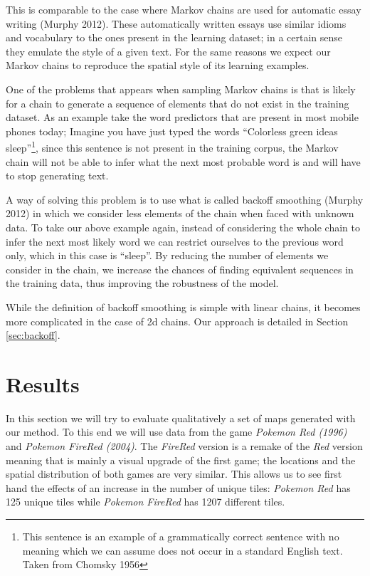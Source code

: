 \documentclass[A4paper,]{article}
\begin{document}
This is comparable to the case where Markov chains are used for
automatic essay writing (Murphy 2012). These automatically written
essays use similar idioms and vocabulary to the ones present in the
learning dataset; in a certain sense they emulate the style of a given
text. For the same reasons we expect our Markov chains to reproduce the
spatial style of its learning examples.

One of the problems that appears when sampling Markov chains is that is
likely for a chain to generate a sequence of elements that do not exist
in the training dataset. As an example take the word predictors that are
present in most mobile phones today; Imagine you have just typed the
words ``Colorless green ideas sleep''\footnote{This sentence is an
  example of a grammatically correct sentence with no meaning which we
  can assume does not occur in a standard English text. Taken from
  Chomsky 1956}, since this sentence is not present in the training
corpus, the Markov chain will not be able to infer what the next most
probable word is and will have to stop generating text.

A way of solving this problem is to use what is called backoff smoothing
(Murphy 2012) in which we consider less elements of the chain when faced
with unknown data. To take our above example again, instead of
considering the whole chain to infer the next most likely word we can
restrict ourselves to the previous word only, which in this case is
``sleep''. By reducing the number of elements we consider in the chain,
we increase the chances of finding equivalent sequences in the training
data, thus improving the robustness of the model.

While the definition of backoff smoothing is simple with linear chains,
it becomes more complicated in the case of 2d chains. Our approach is
detailed in Section \ref{sec:backoff}.

\section{Results}\label{results}

In this section we will try to evaluate qualitatively a set of maps
generated with our method. To this end we will use data from the game
\emph{Pokemon Red (1996)} and \emph{Pokemon FireRed (2004)}. The
\emph{FireRed} version is a remake of the \emph{Red} version meaning
that is mainly a visual upgrade of the first game; the locations and the
spatial distribution of both games are very similar. This allows us to
see first hand the effects of an increase in the number of unique tiles:
\emph{Pokemon Red} has 125 unique tiles while \emph{Pokemon FireRed} has
1207 different tiles.
\end{document}
